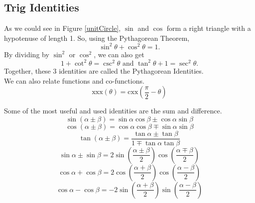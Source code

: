 \subsection{Trig Identities}

As we could see in Figure \ref{unitCircle}, $\sin$ and $\cos$ form a right triangle with a hypotenuse of length 1.
So, using the Pythagorean Theorem,
\begin{equation*}
	\sin^2{\theta} + \cos^2{\theta} = 1.
\end{equation*}
By dividing by $\sin^2$ or $\cos^2$, we can also get
\begin{equation*}
	1 + \cot^2{\theta} = \csc^2{\theta} \text{ and } \tan^2{\theta} + 1 = \sec^2{\theta}.
\end{equation*}
Together, these 3 identities are called the Pythagorean Identities.\\


We can also relate functions and co-functions.
\begin{equation*}
	\text{xxx}(\theta) = \text{cxx}\left(\frac{\pi}{2} - \theta\right)
\end{equation*}


Some of the most useful and used identities are the sum and difference.
\begin{equation*}
	\sin{\left(\alpha \pm \beta\right)} = \sin{\alpha}\cos{\beta} \pm \cos{\alpha}\sin{\beta}
\end{equation*} \begin{equation*}
	\cos{\left(\alpha \pm \beta\right)} = \cos{\alpha}\cos{\beta} \mp \sin{\alpha}\sin{\beta}
\end{equation*} \begin{equation*}
	\tan{\left(\alpha \pm \beta\right)} = \frac{\tan{\alpha} \pm \tan{\beta}}{1 \mp \tan{\alpha}\tan{\beta}}
\end{equation*} \begin{equation*}
	\sin{\alpha} \pm \sin{\beta} = 2\sin{\left(\frac{\alpha \pm \beta}{2}\right)}\cos{\left(\frac{\alpha \mp \beta}{2}\right)}
\end{equation*} \begin{equation*}
	\cos{\alpha} + \cos{\beta} = 2\cos{\left(\frac{\alpha + \beta}{2}\right)}\cos{\left(\frac{\alpha - \beta}{2}\right)}
\end{equation*} \begin{equation*}
	\cos{\alpha} - \cos{\beta} = -2\sin{\left(\frac{\alpha + \beta}{2}\right)}\sin{\left(\frac{\alpha - \beta}{2}\right)}
\end{equation*}